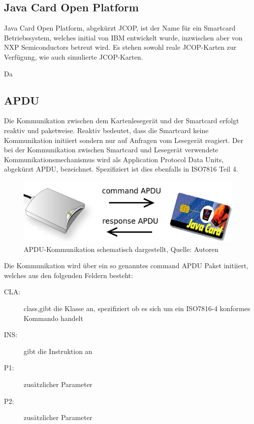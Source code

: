 \documentclass[a4paper,12pt]{scrartcl}
\begin{document}
\subsection{Java Card Open Platform}
\label{subsec:2.2}
Java Card Open Platform, abgekürzt JCOP, ist der Name für ein Smartcard Betriebssystem, welches initial von IBM entwickelt wurde, inzwischen aber von NXP Semiconductors betreut wird. 
Es stehen sowohl reale JCOP-Karten zur Verfügung, wie auch simulierte JCOP-Karten.

Da  

\subsection{APDU}
\label{subsec:2.3}

Die Kommunikation zwischen dem Kartenlesegerät und der Smartcard erfolgt reaktiv und paketweise. Reaktiv bedeutet, dass die Smartcard keine Kommunikation initiiert sondern nur auf Anfragen vom Lesegerät reagiert. Der bei der Kommunikation zwischen Smartcard und Lesegerät verwendete Kommunikationsmechanismus wird als Application Protocol Data Units, abgekürzt APDU, bezeichnet. Spezifiziert ist dies ebenfalls in ISO7816 Teil 4.\cite{iso7816}
\\

\begin{figure}[htb]
\begin{center}
 \includegraphics[width=1\hsize]{./images/apdu.png}
\end{center}
\caption[APDU-Kommunikation schematisch dargestellt, Quelle: Autoren]{\label{apdu}APDU-Kommunikation schematisch dargestellt, Quelle: Autoren}
\end{figure}

Die Kommunikation wird über ein so genanntes command APDU Paket initiiert, welches aus den folgenden Feldern besteht:

\begin{description}
\item[CLA:] class,gibt die Klasse an, spezifiziert ob es sich um ein ISO7816-4 konformes Kommando handelt
\item[INS:] gibt die Instruktion an
\item[P1:] zusätzlicher Parameter
\item[P2:] zusätzlicher Parameter
\end{description} 
\end{document}

